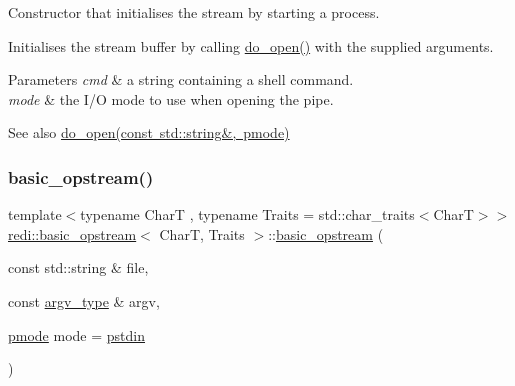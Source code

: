 Constructor that initialises the stream by starting a process. 

Initialises the stream buffer by calling \mbox{\hyperlink{classredi_1_1pstream__common_a2505ab3e3a834b92d98b5bcb97734dfe}{do\+\_\+open()}} with the supplied arguments.


\begin{DoxyParams}{Parameters}
{\em cmd} & a string containing a shell command. \\
\hline
{\em mode} & the I/O mode to use when opening the pipe. \\
\hline
\end{DoxyParams}
\begin{DoxySeeAlso}{See also}
\mbox{\hyperlink{classredi_1_1pstream__common_a2505ab3e3a834b92d98b5bcb97734dfe}{do\+\_\+open(const std\+::string\&, pmode)}} 
\end{DoxySeeAlso}
\mbox{\label{classredi_1_1basic__opstream_a23394be0be6f4f8f7f17981f456b552d}} 
\subsubsection{\texorpdfstring{basic\+\_\+opstream()}{basic\_opstream()}\hspace{0.1cm}{\footnotesize\ttfamily [2/3]}}
{\footnotesize\ttfamily template$<$typename CharT , typename Traits  = std\+::char\+\_\+traits$<$\+Char\+T$>$$>$ \\
\mbox{\hyperlink{classredi_1_1basic__opstream}{redi\+::basic\+\_\+opstream}}$<$ CharT, Traits $>$\+::\mbox{\hyperlink{classredi_1_1basic__opstream}{basic\+\_\+opstream}} (\begin{DoxyParamCaption}\item[{const std\+::string \&}]{file,  }\item[{const \mbox{\hyperlink{structredi_1_1pstreams_af902b894b095c1875e96c10129489467}{argv\+\_\+type}} \&}]{argv,  }\item[{\mbox{\hyperlink{structredi_1_1pstreams_a1eae4aad88812af03a0fbb3ec13c50b7}{pmode}}}]{mode = {\ttfamily \mbox{\hyperlink{structredi_1_1pstreams_a7a976ce992db857f86a0cc3352e42d3a}{pstdin}}} }\end{DoxyParamCaption})\hspace{0.3cm}{\ttfamily [inline]}}



